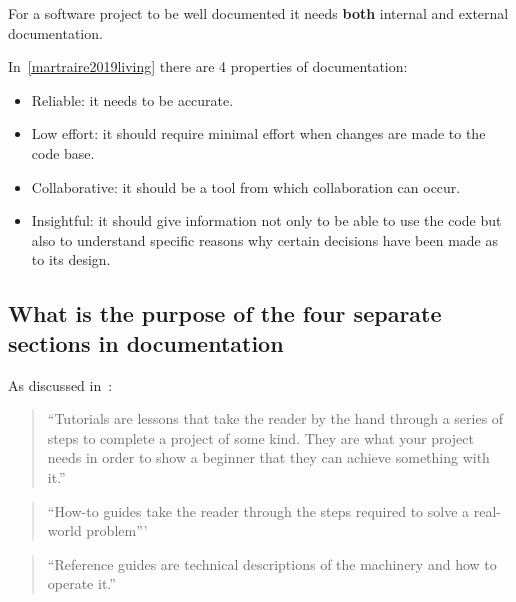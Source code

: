 For a software project to be well documented it needs \textbf{both} internal and
external documentation.


In~\ref{martraire2019living} there are 
4 properties of documentation:
\begin{itemize}
\item 

Reliable: it needs to be accurate.

\item 

Low effort: it should require minimal effort when changes are made to the code
base.

\item 

Collaborative: it should be a tool from which collaboration can occur.

\item 

Insightful: it should give information not only to be able to use the code but
also to understand specific reasons why certain decisions have been made as to
its design.

\end{itemize}


\subsection{What is the purpose of the four separate sections in documentation}
\label{\detokenize{building-tools/06-documentation/why/main:what-is-the-purpose-of-the-four-separate-sections-in-documentation}}

As discussed in~\cite{Procida_Diataxis_documentation_framework}:
\begin{quote}


``Tutorials are lessons that take the reader by the hand through a series of
steps to complete a project of some kind. They are what your project needs in
order to show a beginner that they can achieve something with it.''
\end{quote}


\begin{quote}
``How-to guides take the reader through the steps required to solve a
real-world problem'''
\end{quote}

\begin{quote}
``Reference guides are technical descriptions of the machinery and how to
operate it.''
\end{quote}

